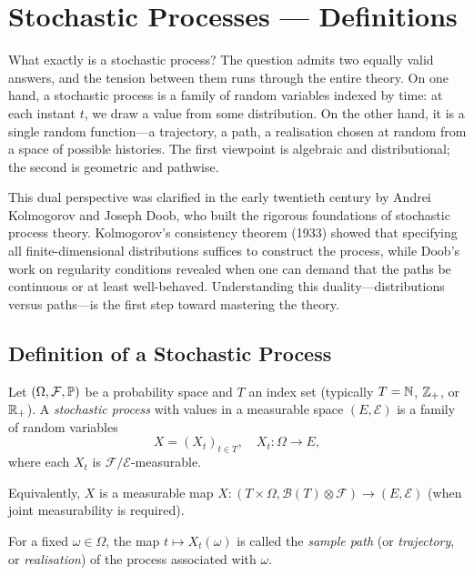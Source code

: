 \chapter{Stochastic Processes --- Definitions}
\label{ch:definitions}

What exactly is a stochastic process? The question admits two equally valid answers, and the tension between them runs through the entire theory. On one hand, a stochastic process is a family of random variables indexed by time: at each instant $t$, we draw a value from some distribution. On the other hand, it is a single random function---a trajectory, a path, a realisation chosen at random from a space of possible histories. The first viewpoint is algebraic and distributional; the second is geometric and pathwise.

This dual perspective was clarified in the early twentieth century by Andrei Kolmogorov and Joseph Doob, who built the rigorous foundations of stochastic process theory. Kolmogorov's consistency theorem (1933) showed that specifying all finite-dimensional distributions suffices to construct the process, while Doob's work on regularity conditions revealed when one can demand that the paths be continuous or at least well-behaved. Understanding this duality---distributions versus paths---is the first step toward mastering the theory.

\section{Definition of a Stochastic Process}

\begin{definition}
Let $(\Omega, \mathcal{F}, \mathbb{P})$ be a probability space and $T$ an index set
(typically $T = \mathbb{N}$, $\mathbb{Z}_+$, or $\mathbb{R}_+$). A \emph{stochastic process} with values
in a measurable space $(E, \mathcal{E})$ is a family of random variables
\[
  X = (X_t)_{t \in T}, \quad X_t : \Omega \to E,
\]
where each $X_t$ is $\mathcal{F}/\mathcal{E}$-measurable.

Equivalently, $X$ is a measurable map
$X : (T \times \Omega, \mathcal{B}(T) \otimes \mathcal{F}) \to (E, \mathcal{E})$
(when joint measurability is required).
\end{definition}

\begin{definition}
For a fixed $\omega \in \Omega$, the map $t \mapsto X_t(\omega)$ is called the
\emph{sample path} (or \emph{trajectory}, or \emph{realisation}) of the process
associated with $\omega$.
\end{definition}

